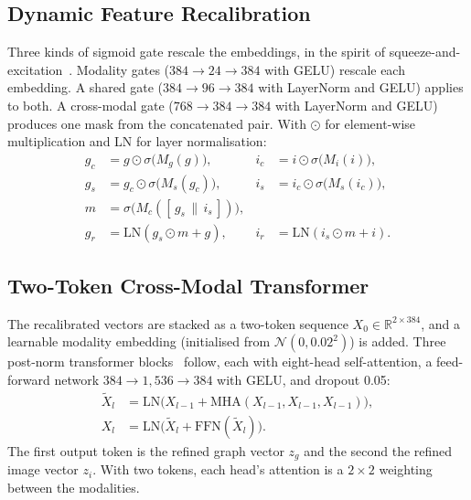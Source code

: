 \documentclass[journal,onecolumn]{IEEEtran}
\newcommand{\R}{\mathbb{R}}
\begin{document}
\subsection{Dynamic Feature Recalibration}
Three kinds of sigmoid gate rescale the embeddings, in the spirit of squeeze-and-excitation~\cite{hu2018senet}. Modality gates ($384 \to 24 \to 384$ with GELU) rescale each embedding. A shared gate ($384 \to 96 \to 384$ with LayerNorm and GELU) applies to both. A cross-modal gate ($768 \to 384 \to 384$ with LayerNorm and GELU) produces one mask from the concatenated pair. With $\odot$ for element-wise multiplication and LN for layer normalisation:
\begin{align}
g_c &= g \odot \sigma\big(M_g(g)\big), & i_c &= i \odot \sigma\big(M_i(i)\big), \\
g_s &= g_c \odot \sigma\big(M_s(g_c)\big), & i_s &= i_c \odot \sigma\big(M_s(i_c)\big), \\
m &= \sigma\big(M_c([\,g_s \,\|\, i_s\,])\big), & & \\
g_r &= \mathrm{LN}(g_s \odot m + g), & i_r &= \mathrm{LN}(i_s \odot m + i).
\end{align}

\subsection{Two-Token Cross-Modal Transformer}
The recalibrated vectors are stacked as a two-token sequence $X_0 \in \R^{2 \times 384}$, and a learnable modality embedding (initialised from $\mathcal{N}(0, 0.02^2)$) is added. Three post-norm transformer blocks~\cite{vaswani2017attention} follow, each with eight-head self-attention, a feed-forward network $384 \to 1{,}536 \to 384$ with GELU, and dropout 0.05:
\begin{align}
\tilde{X}_l &= \mathrm{LN}\big(X_{l-1} + \mathrm{MHA}(X_{l-1}, X_{l-1}, X_{l-1})\big), \\
X_l &= \mathrm{LN}\big(\tilde{X}_l + \mathrm{FFN}(\tilde{X}_l)\big).
\end{align}
The first output token is the refined graph vector $z_g$ and the second the refined image vector $z_i$. With two tokens, each head's attention is a $2 \times 2$ weighting between the modalities.
\end{document}
